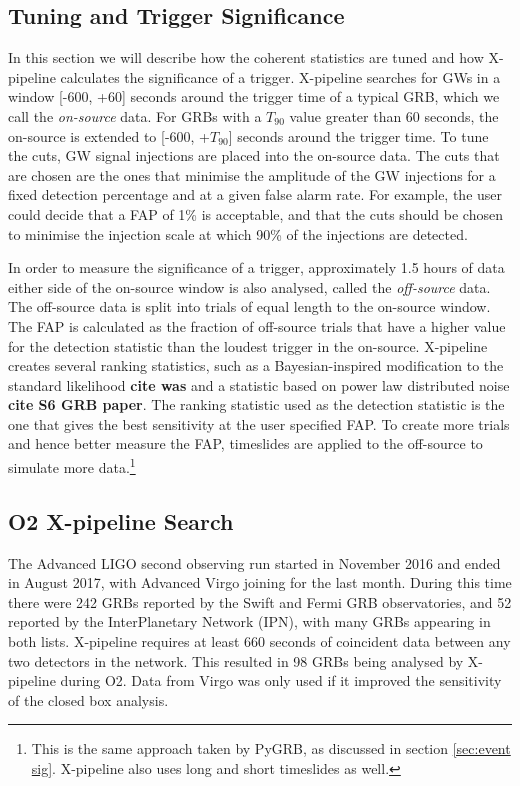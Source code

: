 \documentclass[11pt]{cuthesis}
\newcommand{\xp}{X-pipeline }
\begin{document}
\subsection{Tuning and Trigger Significance}
In this section we will describe how the coherent statistics are tuned and how \xp calculates the significance of a trigger. \xp searches for GWs in a window  [-600, +60] seconds around the trigger time of a typical GRB, which we call the \textit{on-source} data. For GRBs with a $T_{90}$ value greater than 60 seconds, the on-source is extended to [-600, +$T_{90}$] seconds around the trigger time. To tune the cuts, GW signal injections are placed into the on-source data. The cuts that are chosen are the ones that minimise the amplitude of the GW injections for a fixed detection percentage and at a given false alarm rate. For example, the user could decide that a FAP of 1\% is acceptable, and that the cuts should be chosen to minimise the injection scale at which 90\% of the injections are detected.   

In order to measure the significance of a trigger, approximately 1.5 hours of data either side of the on-source window is also analysed, called the \textit{off-source} data. The off-source data is split into trials of equal length to the on-source window. The FAP is calculated as the fraction of off-source trials that have a higher value for the detection statistic than the loudest trigger in the on-source. \xp creates several ranking statistics, such as a Bayesian-inspired modification to the standard likelihood \textbf{cite was} and a statistic based on power law distributed noise \textbf{cite S6 GRB paper}. The ranking statistic used as the detection statistic is the one that gives the best sensitivity at the user specified FAP. To create more trials and hence better measure the FAP, timeslides are applied to the off-source to simulate more data.\footnote{This is the same approach taken by PyGRB, as discussed in section \ref{sec:event sig}. \xp also uses long and short timeslides as well.} 

\subsection{O2 \xp Search} \label{sec:xp o2 results}
The Advanced LIGO second observing run started in November 2016 and ended in August 2017, with Advanced Virgo joining for the last month. During this time there were 242 GRBs reported by the Swift and Fermi GRB observatories, and 52 reported by the InterPlanetary Network (IPN), with many GRBs appearing in both lists. \xp requires at least 660 seconds of coincident data between any two detectors in the network. This resulted in 98 GRBs being analysed by \xp during O2. Data from Virgo was only used if it improved the sensitivity of the closed box analysis. 
\end{document}
